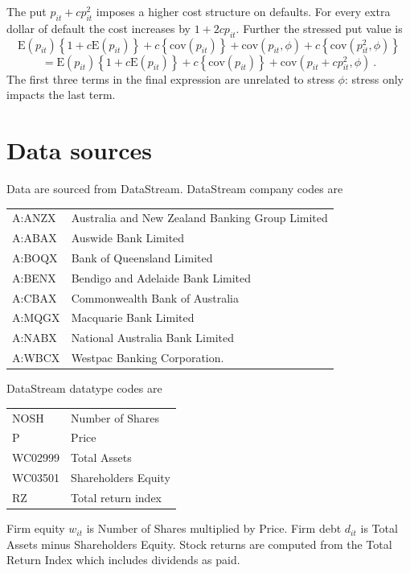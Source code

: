 \documentclass[12pt]{article}
\newcommand{\E}{\mathrm{E}}
\newcommand{\cov}{\mathrm{cov}}
\begin{document}
The put $p_{it}+cp_{it}^2$ imposes a higher cost structure on defaults.    For every extra dollar of default the cost increases by $1+2cp_{it}$.   Further the stressed put value is
$$
\E(p_{it})\left\{1+c\E(p_{it})\right\} +c\left\{\cov(p_{it})\right\}+ \cov(p_{it},\phi) + c\left\{\cov(p^2_{it},\phi)\right\}
$$
$$
=\E(p_{it})\left\{1+c\E(p_{it})\right\} +c\left\{\cov(p_{it})\right\}+ \cov(p_{it}+cp^2_{it},\phi)\ .
$$
The first three terms in the final expression are unrelated to stress $\phi$: stress only impacts the last term.

\section{Data sources}\label{data}

Data are sourced from DataStream. DataStream company codes are 
\begin{center}
	\begin{tabular}{ll}
A:ANZX & Australia and New Zealand Banking Group Limited\\
A:ABAX & Auswide Bank Limited\\
A:BOQX & Bank of Queensland Limited\\
A:BENX & Bendigo and Adelaide Bank Limited\\
A:CBAX & Commonwealth Bank of Australia\\
A:MQGX & Macquarie Bank Limited\\
A:NABX & National Australia Bank Limited\\
A:WBCX & Westpac Banking Corporation.\\	
\end{tabular}
\end{center}

DataStream datatype codes are
\begin{center}
	\begin{tabular}{ll}
	NOSH & Number of Shares\\
	P & Price\\
	WC02999 & Total Assets\\
	WC03501 & Shareholders Equity\\
	RZ & Total return index\\
\end{tabular}
\end{center}

Firm equity $w_{it}$ is Number of Shares multiplied by Price. Firm debt $d_{it}$ is Total Assets minus Shareholders Equity. Stock returns are computed from the Total Return Index which includes dividends as paid. 
\end{document}
